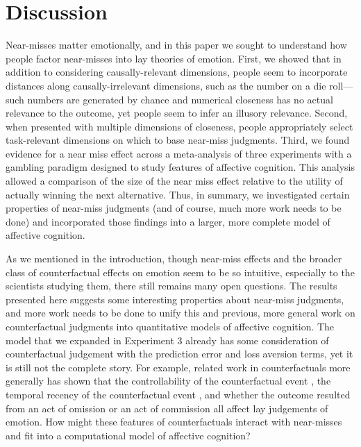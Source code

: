 \documentclass[10pt,letterpaper]{article}
\begin{document}
\section{Discussion}

Near-misses matter emotionally, and in this paper we sought to understand how people factor near-misses into lay theories of emotion. First, we showed that in addition to considering causally-relevant dimensions, people seem to incorporate distances along causally-irrelevant dimensions, such as the number on a die roll---such numbers are generated by chance and numerical closeness has no actual relevance to the outcome, yet people seem to infer an illusory relevance. Second, when presented with multiple dimensions of closeness, people appropriately select task-relevant dimensions on which to base near-miss judgments. Third, we found evidence for a near miss effect across a meta-analysis of three experiments with a gambling paradigm designed to study features of affective cognition. This analysis allowed a comparison of the size of the near miss effect relative to the utility of actually winning the next alternative. Thus, in summary, we investigated certain properties of near-miss judgments (and of course, much more work needs to be done) and incorporated those findings into a larger, more complete model of affective cognition.


As we mentioned in the introduction, though near-miss effects and the broader class of counterfactual effects on emotion seem to be so intuitive, especially to the scientists studying them, there still remains many open questions. The results presented here suggests some interesting properties about near-miss judgments, and more work needs to be done to unify this and previous, more general work on counterfactual judgments into quantitative models of affective cognition. The model that we expanded in Experiment 3 already has some consideration of counterfactual judgement with the prediction error and loss aversion terms, yet it is still not the complete story. For example, related work in counterfactuals more generally has shown that the controllability of the counterfactual event \cite{Roese1995}, the temporal recency of the counterfactual event \cite{Miller1990}, and whether the outcome resulted from an act of omission or an act of commission \cite{Kahneman1982, Landman1987} all affect lay judgements of emotion. How might these features of counterfactuals interact with near-misses and fit into a computational model of affective cognition?
\end{document}
